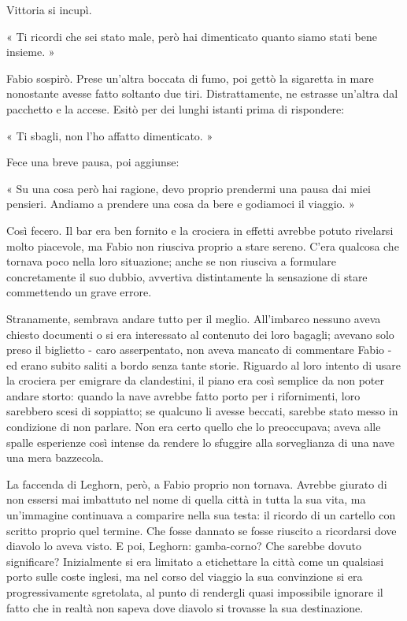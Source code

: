 Vittoria si incupì.

« Ti ricordi che sei stato male, però hai dimenticato quanto siamo stati bene insieme. »

Fabio sospirò. Prese un'altra boccata di fumo, poi gettò la sigaretta in mare nonostante avesse fatto soltanto due tiri. Distrattamente, ne estrasse un'altra dal pacchetto e la accese. Esitò per dei lunghi istanti prima di rispondere:

« Ti sbagli, non l'ho affatto dimenticato. »

Fece una breve pausa, poi aggiunse:

« Su una cosa però hai ragione, devo proprio prendermi una pausa dai miei pensieri. Andiamo a prendere una cosa da bere e godiamoci il viaggio. »

Così fecero. Il bar era ben fornito e la crociera in effetti avrebbe potuto rivelarsi molto piacevole, ma Fabio non riusciva proprio a stare sereno. C'era qualcosa che tornava poco nella loro situazione; anche se non riusciva a formulare concretamente il suo dubbio, avvertiva distintamente la sensazione di stare commettendo un grave errore.

Stranamente, sembrava andare tutto per il meglio. All'imbarco nessuno aveva chiesto documenti o si era interessato al contenuto dei loro bagagli; avevano solo preso il biglietto - caro asserpentato, non aveva mancato di commentare Fabio - ed erano subito saliti a bordo senza tante storie. Riguardo al loro intento di usare la crociera per emigrare da clandestini, il piano era così semplice da non poter andare storto: quando la nave avrebbe fatto porto per i rifornimenti, loro sarebbero scesi di soppiatto; se qualcuno li avesse beccati, sarebbe stato messo in condizione di non parlare. Non era certo quello che lo preoccupava; aveva alle spalle esperienze così intense da rendere lo sfuggire alla sorveglianza di una nave una mera bazzecola.

La faccenda di Leghorn, però, a Fabio proprio non tornava. Avrebbe giurato di non essersi mai imbattuto nel nome di quella città in tutta la sua vita, ma un'immagine continuava a comparire nella sua testa: il ricordo di un cartello con scritto proprio quel termine. Che fosse dannato se fosse riuscito a ricordarsi dove diavolo lo aveva visto. E poi, Leghorn: gamba-corno? Che sarebbe dovuto significare? Inizialmente si era limitato a etichettare la città come un qualsiasi porto sulle coste inglesi, ma nel corso del viaggio la sua convinzione si era progressivamente sgretolata, al punto di rendergli quasi impossibile ignorare il fatto che in realtà non sapeva dove diavolo si trovasse la sua destinazione.

